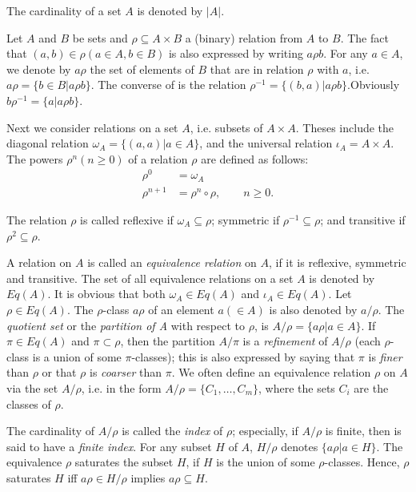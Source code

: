 The cardinality of a set $A$ is denoted by $|A|$. 

Let $A$ and $B$ be sets and $\rho\subseteq A\times B$ a (binary) relation from $A$ to $B$. The fact that $(a,b)\in\rho (a\in A,b\in B)$ is also expressed by writing $a\rho b$. For any $a\in A$, we denote by $a\rho$ the set of elements of $B$ that are in relation $\rho$ with $a$, i.e. $a\rho=\{b\in B|a\rho b\}$. The converse of is the relation $\rho^{-1}=\{(b,a)|a\rho b\}$.Obviously $b\rho^{-1}=\{a|a\rho b\}$.

Next we consider relations on a set $A$, i.e. subsets of $A\times A$.
Theses include the diagonal relation $\omega_A=\{(a,a)|a\in A \}$, and the universal relation $\iota_A=A\times A$. The powers $\rho^n(n\ge 0)$ of a relation $\rho$ are defined as follows:
\begin{align*}
\rho^0 &=\omega_A \\
\rho^{n+1} &=\rho^n\circ \rho, \qquad n\ge 0.
\end{align*}

The relation $\rho$ is called reflexive if $\omega_A\subseteq\rho$; symmetric if $\rho^{-1}\subseteq\rho$; and transitive if $\rho^2\subseteq\rho$.

A relation on $A$ is called an \textit{equivalence relation} on $A$, if it is reflexive, symmetric and transitive. The set of all equivalence relations on a set $A$ is denoted by $Eq(A)$. It is obvious that both $\omega_A\in Eq(A)$ and $\iota_A \in Eq(A)$. Let $\rho\in Eq(A)$. The $\rho$-class $a\rho$ of an element $a (\in A)$ is also denoted by $a/\rho$. The \textit{quotient set} or the \textit{partition of A} with
respect to $\rho$, is $A/\rho=\{a\rho|a\in A \}$. If $\pi\in Eq(A)$ and $\pi\subset \rho$, then the partition $A/\pi$ is a \textit{refinement} of $A/\rho$ (each $\rho$-class is a union of some $\pi$-classes); this is also expressed by saying that $\pi$ is \textit{finer} than $\rho$ or that $\rho$ is \textit{coarser} than $\pi$. We often define an equivalence relation $\rho$ on $A$ via the set $A/\rho$, i.e. in the form $A/\rho=\{C_1,\dots,C_m \}$, where the sets $C_i$ are the classes of $\rho$.

The cardinality of $A/\rho$ is called the \textit{index} of $\rho$; especially, if $A/\rho$ is finite, then is said to have a  \textit{finite index}. For any subset $H$ of $A$, $H/\rho$ denotes $\{a\rho|a\in H \}$. The equivalence $\rho$ saturates the subset $H$, if $H$ is the union of some $\rho$-classes. Hence, $\rho$ saturates $H$ iff $a\rho\in H/\rho$ implies $a\rho\subseteq H$.

